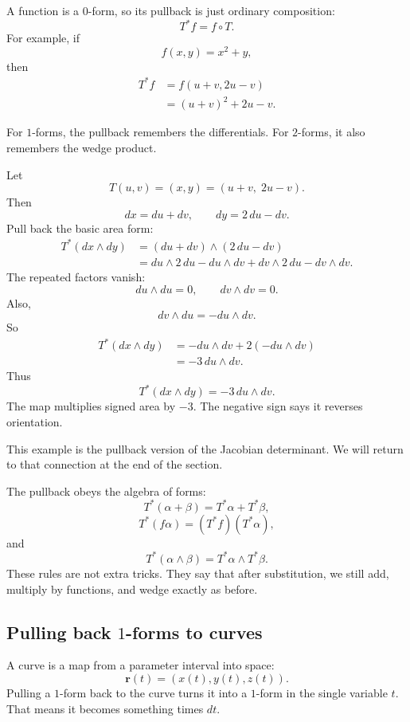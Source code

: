 A function is a \(0\)-form, so its pullback is just ordinary composition:
\[
\boxed{
    T^*f=f\circ T.
}
\]
For example, if
\[
    f(x,y)=x^2+y,
\]
then
\[
\begin{aligned}
    T^*f
    &=
    f(u+v,2u-v)\\
    &=
    (u+v)^2+2u-v.
\end{aligned}
\]

For \(1\)-forms, the pullback remembers the differentials.  For \(2\)-forms, it also
remembers the wedge product.

\begin{example}
Let
\[
    T(u,v)=(x,y)=(u+v,\;2u-v).
\]
Then
\[
    dx=du+dv,
    \qquad
    dy=2\,du-dv.
\]
Pull back the basic area form:
\[
\begin{aligned}
    T^*(dx\wedge dy)
    &=
    (du+dv)\wedge(2\,du-dv)\\
    &=
    du\wedge 2\,du
    -
    du\wedge dv
    +
    dv\wedge 2\,du
    -
    dv\wedge dv.
\end{aligned}
\]
The repeated factors vanish:
\[
    du\wedge du=0,
    \qquad
    dv\wedge dv=0.
\]
Also,
\[
    dv\wedge du=-du\wedge dv.
\]
So
\[
\begin{aligned}
    T^*(dx\wedge dy)
    &=
    -du\wedge dv
    +
    2(-du\wedge dv)\\
    &=
    -3\,du\wedge dv.
\end{aligned}
\]
Thus
\[
\boxed{
    T^*(dx\wedge dy)=-3\,du\wedge dv.
}
\]
The map multiplies signed area by \(-3\).  The negative sign says it reverses
orientation.
\end{example}

This example is the pullback version of the Jacobian determinant.  We will return to
that connection at the end of the section.

The pullback obeys the algebra of forms:
\[
\boxed{
    T^*(\alpha+\beta)=T^*\alpha+T^*\beta,
}
\]
\[
\boxed{
    T^*(f\alpha)=(T^*f)(T^*\alpha),
}
\]
and
\[
\boxed{
    T^*(\alpha\wedge\beta)=T^*\alpha\wedge T^*\beta.
}
\]
These rules are not extra tricks.  They say that after substitution, we still add,
multiply by functions, and wedge exactly as before.

\subsection{Pulling back \texorpdfstring{\(1\)}{1}-forms to curves}

A curve is a map from a parameter interval into space:
\[
    \mathbf r(t)=(x(t),y(t),z(t)).
\]
Pulling a \(1\)-form back to the curve turns it into a \(1\)-form in the single variable
\(t\).  That means it becomes something times \(dt\).

